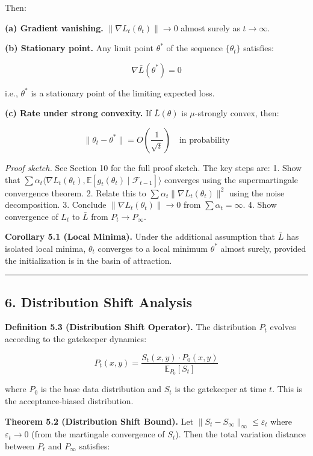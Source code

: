 \documentclass[
  12pt,
]{article}
\begin{document}
Then:

\textbf{(a) Gradient vanishing.} \(\|\nabla L_t(\theta_t)\| \to 0\)
almost surely as \(t \to \infty\).

\textbf{(b) Stationary point.} Any limit point \(\theta^*\) of the
sequence \(\{\theta_t\}\) satisfies:

\[
\nabla \bar{L}(\theta^*) = 0
\]

i.e., \(\theta^*\) is a stationary point of the limiting expected loss.

\textbf{(c) Rate under strong convexity.} If \(\bar{L}(\theta)\) is
\(\mu\)-strongly convex, then:

\[
\|\theta_t - \theta^*\| = O\left(\frac{1}{\sqrt{t}}\right) \quad \text{in probability}
\]

\emph{Proof sketch.} See Section 10 for the full proof sketch. The key
steps are: 1. Show that
\(\sum \alpha_t \langle \nabla L_t(\theta_t), \mathbb{E}[g_t(\theta_t) \mid \mathcal{F}_{t-1}] \rangle\)
converges using the supermartingale convergence theorem. 2. Relate this
to \(\sum \alpha_t \|\nabla L_t(\theta_t)\|^2\) using the noise
decomposition. 3. Conclude \(\|\nabla L_t(\theta_t)\| \to 0\) from
\(\sum \alpha_t = \infty\). 4. Show convergence of \(L_t\) to
\(\bar{L}\) from \(P_t \to P_\infty\).

\textbf{Corollary 5.1 (Local Minima).} Under the additional assumption
that \(\bar{L}\) has isolated local minima, \(\theta_t\) converges to a
local minimum \(\theta^*\) almost surely, provided the initialization is
in the basin of attraction.

\begin{center}\rule{0.5\linewidth}{0.5pt}\end{center}

\subsection{6. Distribution Shift
Analysis}\label{distribution-shift-analysis}

\textbf{Definition 5.3 (Distribution Shift Operator).} The distribution
\(P_t\) evolves according to the gatekeeper dynamics:

\[
P_t(x,y) = \frac{S_t(x,y) \cdot P_0(x,y)}{\mathbb{E}_{P_0}[S_t]}
\]

where \(P_0\) is the base data distribution and \(S_t\) is the
gatekeeper at time \(t\). This is the acceptance-biased distribution.

\textbf{Theorem 5.2 (Distribution Shift Bound).} Let
\(\|S_t - S_\infty\|_\infty \leq \varepsilon_t\) where
\(\varepsilon_t \to 0\) (from the martingale convergence of \(S_t\)).
Then the total variation distance between \(P_t\) and \(P_\infty\)
satisfies:
\end{document}

